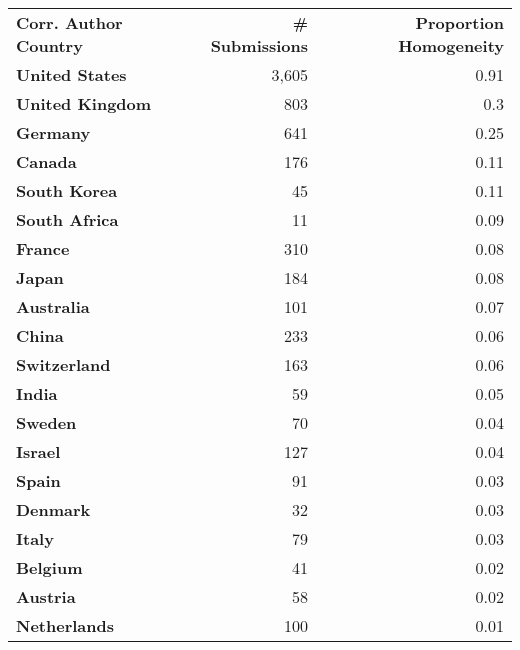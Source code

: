 \documentclass[10pt,letterpaper]{article}
\begin{document}
\begin{table}[!ht]
\centering
\begin{tabular}{l|r|r}
\textbf{Corr. Author Country} & \textbf{\# Submissions} & \textbf{Proportion Homogeneity} \\
\textbf{United States}        & 3,605                   & 0.91                            \\
\textbf{United Kingdom}       & 803                     & 0.3                             \\
\textbf{Germany}              & 641                     & 0.25                            \\
\textbf{Canada}               & 176                     & 0.11                            \\
\textbf{South Korea}          & 45                      & 0.11                            \\
\textbf{South Africa}         & 11                      & 0.09                            \\
\textbf{France}               & 310                     & 0.08                            \\
\textbf{Japan}                & 184                     & 0.08                            \\
\textbf{Australia}            & 101                     & 0.07                            \\
\textbf{China}                & 233                     & 0.06                            \\
\textbf{Switzerland}          & 163                     & 0.06                            \\
\textbf{India}                & 59                      & 0.05                            \\
\textbf{Sweden}               & 70                      & 0.04                            \\
\textbf{Israel}               & 127                     & 0.04                            \\
\textbf{Spain}                & 91                      & 0.03                            \\
\textbf{Denmark}              & 32                      & 0.03                            \\
\textbf{Italy}                & 79                      & 0.03                            \\
\textbf{Belgium}              & 41                      & 0.02                            \\
\textbf{Austria}                       & 58                      & 0.02                            \\
\textbf{Netherlands}          & 100                     & 0.01                           
\end{tabular}
\end{table}
\end{document}
